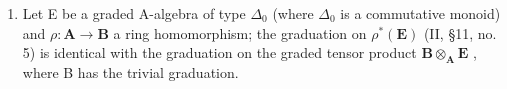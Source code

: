 \begin{enumerate}
\def\labelenumi{(\arabic{enumi})}
\setcounter{enumi}{1}
\tightlist
\item
  Let E be a graded A-algebra of type \(\Delta_0\) (where \(\Delta_0\) is a commutative monoid) and \(\rho: \mathbf{A} \to \mathbf{B}\) a ring homomorphism; the graduation on \(\rho^*(\mathbf{E})\) (II, §11, no. 5) is identical with the graduation on the graded tensor product \(\mathbf{B} \otimes_{\mathbf{A}} \mathbf{E}\) , where B has the trivial graduation.
\end{enumerate}
\relax{}
